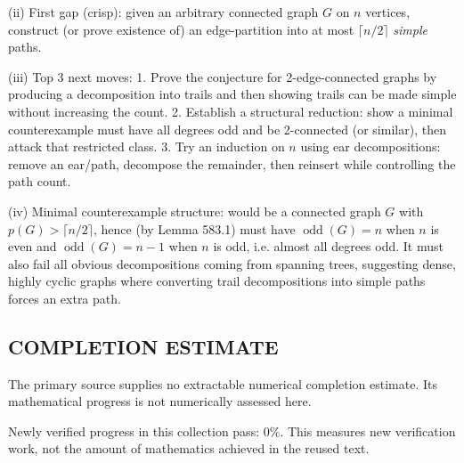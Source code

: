 (ii) First gap (crisp): given an arbitrary connected graph $G$ on $n$ vertices, construct (or prove existence of) an edge-partition into at most $\lceil n/2\rceil$ \emph{simple} paths.

(iii) Top 3 next moves:
1. Prove the conjecture for 2-edge-connected graphs by producing a decomposition into trails and then showing trails can be made simple without increasing the count.
2. Establish a structural reduction: show a minimal counterexample must have all degrees odd and be 2-connected (or similar), then attack that restricted class.
3. Try an induction on $n$ using ear decompositions: remove an ear/path, decompose the remainder, then reinsert while controlling the path count.

(iv) Minimal counterexample structure: would be a connected graph $G$ with $p(G)>\lceil n/2\rceil$, hence (by Lemma 583.1) must have $\operatorname{odd}(G)=n$ when $n$ is even and $\operatorname{odd}(G)=n-1$ when $n$ is odd, i.e. almost all degrees odd. It must also fail all obvious decompositions coming from spanning trees, suggesting dense, highly cyclic graphs where converting trail decompositions into simple paths forces an extra path.




\subsection*{COMPLETION ESTIMATE}
The primary source supplies no extractable numerical completion estimate. Its mathematical progress is not numerically assessed here.

Newly verified progress in this collection pass: $0\%$. This measures new verification work, not the amount of mathematics achieved in the reused text.
